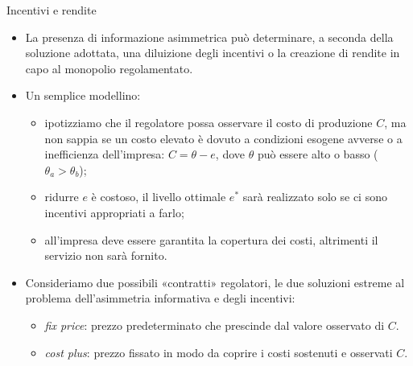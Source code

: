 \documentclass[aspectratio=64,12pt]{beamer}
\begin{document}
\begin{frame}{Incentivi e rendite}
\begin{itemize}
\item La presenza di informazione asimmetrica può determinare, a seconda della
soluzione adottata, una \alert{diluizione degli incentivi} o la creazione di
\alert{rendite} in capo al monopolio regolamentato.
\item Un semplice modellino:
\begin{itemize}
\item ipotizziamo che il regolatore possa osservare il costo di produzione $C$, ma
non sappia se un costo elevato è dovuto a condizioni esogene avverse o a
inefficienza dell'impresa: $C=\theta-e$, dove $\theta$ può essere alto
o basso ($\theta_a>\theta_b$);
\item ridurre $e$ è costoso, il livello ottimale $e^*$ sarà realizzato solo se
ci sono incentivi appropriati a farlo;
\item all'impresa deve essere garantita la copertura dei costi, altrimenti il
servizio non sarà fornito.
\end{itemize}
\item Consideriamo due possibili «contratti» regolatori, le due
soluzioni estreme al problema dell'asimmetria informativa e degli incentivi:
\begin{itemize}
\item \emph{fix price}: prezzo predeterminato che prescinde dal valore
  osservato di $C$.
\item \emph{cost plus}: prezzo fissato in modo da coprire i costi sostenuti e osservati $C$.
\end{itemize}
\end{itemize}
\end{frame}
\end{document}
